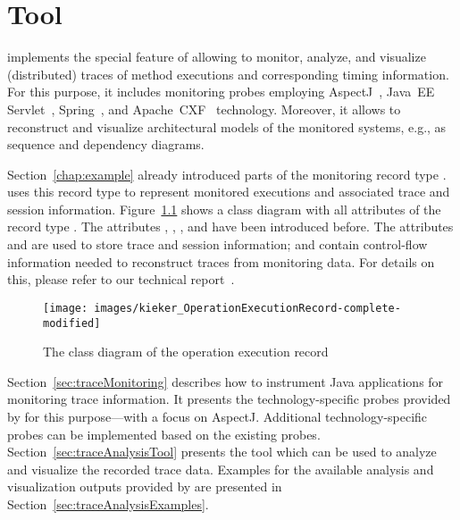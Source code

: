 %

\chapter{\KiekerTraceAnalysis{} Tool}\label{chap:aspectJ}

\KiekerTraceAnalysis{} implements the special feature of \Kieker{} allowing to %
monitor, analyze, and visualize (distributed) traces of method executions and %
corresponding timing information. For this purpose, it includes monitoring probes employing %
AspectJ~\cite{AspectJ-WebSite}, Java~EE Servlet~\cite{JavaServletTechnology-WebSite}, %
Spring~\cite{Spring-WebSite}, and Apache~CXF~\cite{CXF-WebSite} technology. %
Moreover, it allows to reconstruct and visualize architectural models of the %
monitored systems, e.g., as sequence and dependency diagrams. %

Section~\ref{chap:example} already introduced parts of the monitoring record %
type . \KiekerTraceAnalysis{} uses this record %
type to represent monitored executions and associated trace and session information. %
Figure~\ref{fig:OperationExecutionRecordClassDiagramComplete} shows a class diagram %
with all attributes of the record type . %
The attributes , , %
, and  have been introduced before. %
The attributes  and  are used to store %
trace and session information;  and  contain control-flow %
information needed to reconstruct traces from monitoring data. %
For details on this, please refer to our technical %
report~\cite{vanHoornRohrHasselbringWallerEhlersFreyKieselhorst2009TRContinuousMonitoringOfSoftwareServicesDesignAndApplicationOfTheKiekerFramework}.

\begin{figure}[hb]\centering
\texttt{[image: images/kieker\_OperationExecutionRecord-complete-modified]}%
\caption{The class diagram of the operation execution record}
\label{fig:OperationExecutionRecordClassDiagramComplete}
\end{figure}

\enlargethispage{1cm}

\noindent Section~\ref{sec:traceMonitoring} describes how to instrument Java %
applications for monitoring trace information. %
It presents the technology-specific probes provided by \Kieker{} for this %
purpose---with a focus on AspectJ. %
Additional technology-specific probes can be implemented based on the existing %
probes. %
Section~\ref{sec:traceAnalysisTool} presents the %
tool which can be used to analyze and visualize the recorded trace %
data.  Examples for the available analysis and visualization outputs %
provided by \KiekerTraceAnalysis{} are presented in %
Section~\ref{sec:traceAnalysisExamples}.

